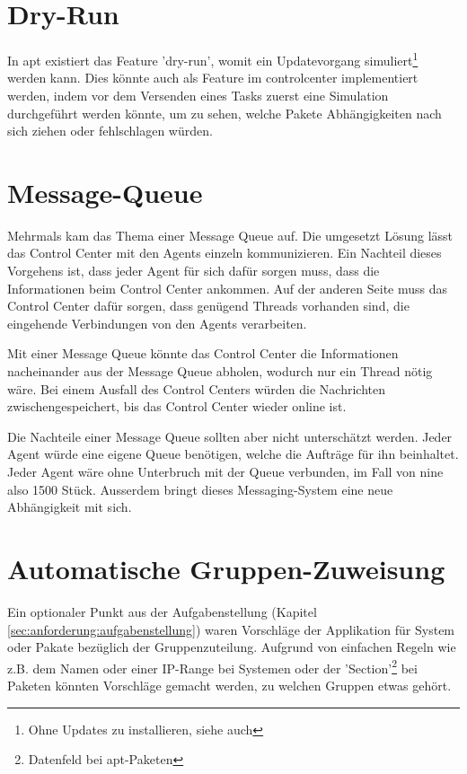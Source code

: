 \section{Dry-Run}

In \gls{apt} existiert das Feature 'dry-run', womit ein Updatevorgang simuliert\footnote{Ohne Updates zu installieren, siehe auch } werden kann. Dies könnte auch als Feature im \gls{controlcenter} implementiert werden, indem vor dem Versenden eines Tasks zuerst eine Simulation durchgeführt werden könnte, um zu sehen, welche Pakete Abhängigkeiten nach sich ziehen oder fehlschlagen würden.

\section{Message-Queue} \label{sec:ausblick:message_queue}

Mehrmals kam das Thema einer Message Queue auf. Die umgesetzt Lösung lässt das Control Center mit den Agents einzeln kommunizieren. Ein Nachteil dieses Vorgehens ist, dass jeder Agent für sich dafür sorgen muss, dass die Informationen beim Control Center ankommen. Auf der anderen Seite muss das Control Center dafür sorgen, dass genügend Threads vorhanden sind, die eingehende Verbindungen von den Agents verarbeiten.

Mit einer Message Queue könnte das Control Center die Informationen nacheinander aus der Message Queue abholen, wodurch nur ein Thread nötig wäre. Bei einem Ausfall des Control Centers würden die Nachrichten zwischengespeichert, bis das Control Center wieder online ist.

Die Nachteile einer Message Queue sollten aber nicht unterschätzt werden. Jeder Agent würde eine eigene Queue benötigen, welche die Aufträge für ihn beinhaltet. Jeder Agent wäre ohne Unterbruch mit der Queue verbunden, im Fall von \gls{nine} also 1500 Stück. Ausserdem bringt dieses Messaging-System eine neue Abhängigkeit mit sich. 

\section{Automatische Gruppen-Zuweisung} \label{sec:ausblick:auto_group_assignment}

Ein optionaler Punkt aus der Aufgabenstellung (Kapitel \ref{sec:anforderung:aufgabenstellung}) waren Vorschläge der Applikation für System oder Pakate bezüglich der Gruppenzuteilung. Aufgrund von einfachen Regeln wie z.B. dem Namen oder einer IP-Range bei Systemen oder der 'Section'\footnote{Datenfeld bei apt-Paketen} bei Paketen könnten Vorschläge gemacht werden, zu welchen Gruppen etwas gehört.


